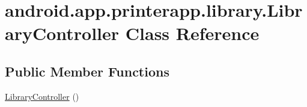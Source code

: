 \hypertarget{classandroid_1_1app_1_1printerapp_1_1library_1_1_library_controller}{}\section{android.\+app.\+printerapp.\+library.\+Library\+Controller Class Reference}
\label{classandroid_1_1app_1_1printerapp_1_1library_1_1_library_controller}
\subsection*{Public Member Functions}
\begin{DoxyCompactItemize}
\item 
\hyperlink{classandroid_1_1app_1_1printerapp_1_1library_1_1_library_controller_a8776de6e91d540216ed1d9cb96de7e03}{Library\+Controller} ()
\end{DoxyCompactItemize}
